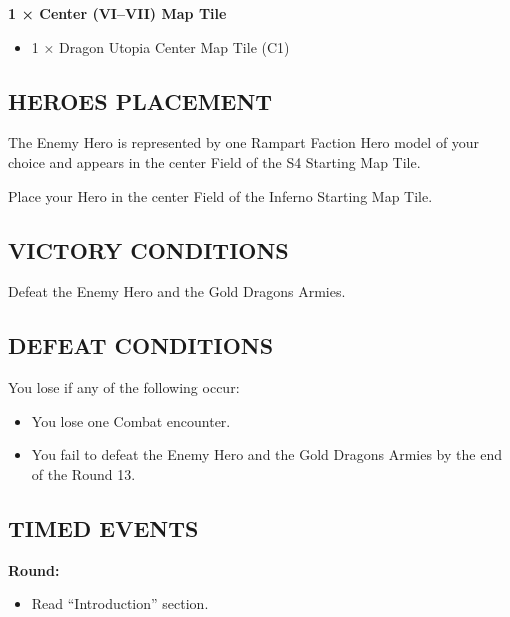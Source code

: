 \begin{multicols*}{2}
\textbf{1 × Center (VI--VII) Map Tile}
\begin{itemize}
  \item 1 × Dragon Utopia Center Map Tile (C1)
\end{itemize}

\subsection*{\MakeUppercase{Heroes Placement}}

The Enemy Hero is represented by one Rampart Faction Hero model of your choice
and appears in the center Field of the S4 Starting Map Tile.

Place your Hero in the center Field of the Inferno Starting Map Tile.

\subsection*{\MakeUppercase{Victory Conditions}}

Defeat the Enemy Hero and the Gold Dragons Armies.

\subsection*{\MakeUppercase{Defeat Conditions}}

You lose if any of the following occur:
\begin{itemize}
  \item You lose one Combat encounter.
  \item You fail to defeat the Enemy Hero and the Gold Dragons Armies by the end of the Round 13.
\end{itemize}


\vspace*{\fill}
\columnbreak

\subsection*{\MakeUppercase{Timed Events}}

\textbf{ Round:}
\begin{itemize}
  \item Read ``Introduction'' section.
\end{itemize}


\end{multicols*}

